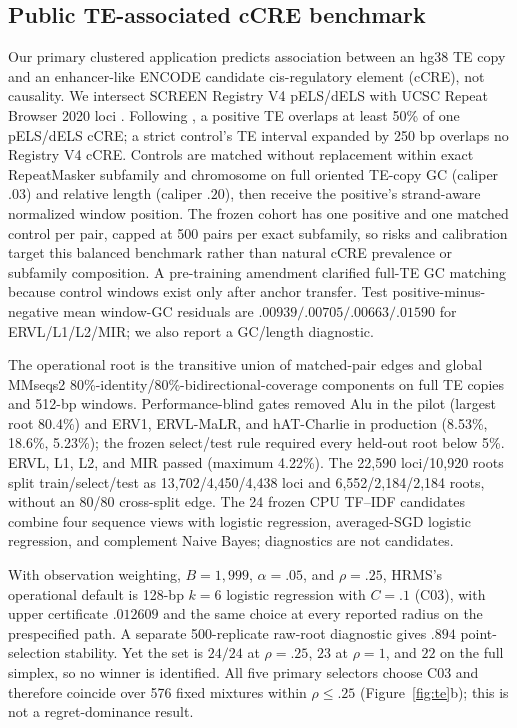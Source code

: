 \documentclass{article}
\begin{document}
\subsection{Public TE-associated cCRE benchmark}

Our primary clustered application predicts association between an hg38 TE copy and an enhancer-like ENCODE candidate cis-regulatory element (cCRE), not causality.  We intersect SCREEN Registry V4 pELS/dELS \citep{moore2026registry} with UCSC Repeat Browser 2020 loci \citep{fernandes2020repeatbrowser}.  Following \citet{du2024regulatory}, a positive TE overlaps at least 50\% of one pELS/dELS cCRE; a strict control's TE interval expanded by 250 bp overlaps no Registry V4 cCRE.  Controls are matched without replacement within exact RepeatMasker subfamily and chromosome on full oriented TE-copy GC (caliper $.03$) and relative length (caliper $.20$), then receive the positive's strand-aware normalized window position.  The frozen cohort has one positive and one matched control per pair, capped at 500 pairs per exact subfamily, so risks and calibration target this balanced benchmark rather than natural cCRE prevalence or subfamily composition.  A pre-training amendment clarified full-TE GC matching because control windows exist only after anchor transfer.  Test positive-minus-negative mean window-GC residuals are $.00939/.00705/.00663/.01590$ for ERVL/L1/L2/MIR; we also report a GC/length diagnostic.

The operational root is the transitive union of matched-pair edges and global MMseqs2 \citep{steinegger2017mmseqs2} 80\%-identity/80\%-bidirectional-coverage components on full TE copies and 512-bp windows.  Performance-blind gates removed Alu in the pilot (largest root 80.4\%) and ERV1, ERVL-MaLR, and hAT-Charlie in production (8.53\%, 18.6\%, 5.23\%); the frozen select/test rule required every held-out root below 5\%.  ERVL, L1, L2, and MIR passed (maximum 4.22\%).  The 22,590 loci/10,920 roots split train/select/test as 13,702/4,450/4,438 loci and 6,552/2,184/2,184 roots, without an 80/80 cross-split edge.  The 24 frozen CPU TF--IDF candidates combine four sequence views with logistic regression, averaged-SGD logistic regression, and complement Naive Bayes; diagnostics are not candidates.

With observation weighting, $B=1{,}999$, $\alpha=.05$, and $\rho=.25$, HRMS's operational default is 128-bp $k=6$ logistic regression with $C=.1$ (C03), with upper certificate $.012609$ and the same choice at every reported radius on the prespecified path.  A separate 500-replicate raw-root diagnostic gives $.894$ point-selection stability.  Yet the set is $24/24$ at $\rho=.25$, $23$ at $\rho=1$, and $22$ on the full simplex, so no winner is identified.  All five primary selectors choose C03 and therefore coincide over 576 fixed mixtures within $\rho\leq.25$ (Figure~\ref{fig:te}b); this is not a regret-dominance result.
\end{document}
